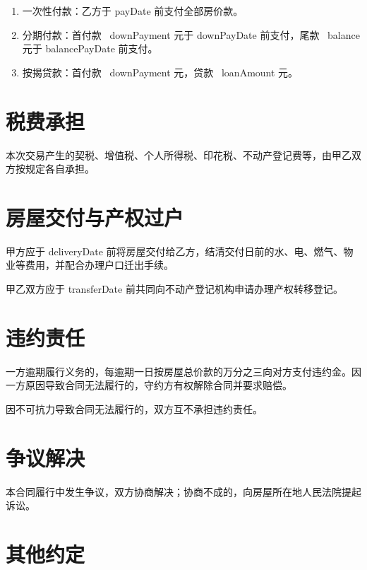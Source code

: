 \documentclass[UTF8,a4paper,12pt]{ctexart}
\begin{document}
\begin{enumerate}[label=(\arabic*),nosep]
  \item 一次性付款：乙方于 {{payDate}} 前支付全部房价款。
  \item 分期付款：首付款 \textyen\ {{downPayment}} 元于 {{downPayDate}} 前支付，尾款 \textyen\ {{balance}} 元于 {{balancePayDate}} 前支付。
  \item 按揭贷款：首付款 \textyen\ {{downPayment}} 元，贷款 \textyen\ {{loanAmount}} 元。
\end{enumerate}

\section{税费承担}

本次交易产生的契税、增值税、个人所得税、印花税、不动产登记费等，由甲乙双方按规定各自承担。

\section{房屋交付与产权过户}

甲方应于 {{deliveryDate}} 前将房屋交付给乙方，结清交付日前的水、电、燃气、物业等费用，并配合办理户口迁出手续。

甲乙双方应于 {{transferDate}} 前共同向不动产登记机构申请办理产权转移登记。

\section{违约责任}

一方逾期履行义务的，每逾期一日按房屋总价款的万分之三向对方支付违约金。因一方原因导致合同无法履行的，守约方有权解除合同并要求赔偿。

因不可抗力导致合同无法履行的，双方互不承担违约责任。

\section{争议解决}

本合同履行中发生争议，双方协商解决；协商不成的，向房屋所在地人民法院提起诉讼。

\section{其他约定}
\end{document}
